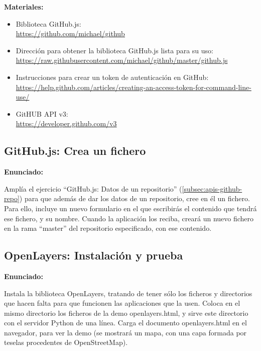 \textbf{Materiales:}

\begin{itemize}
\item Biblioteca GitHub.js: \\
  \url{https://github.com/michael/github}
\item Dirección para obtener la biblioteca GitHub.js lista para su uso: \\
  \url{https://raw.githubusercontent.com/michael/github/master/github.js}
\item Instrucciones para crear un token de autenticación en GitHub: \\
  \url{https://help.github.com/articles/creating-an-access-token-for-command-line-use/}
\item GitHUB API v3: \\
  \url{https://developer.github.com/v3}
\end{itemize}

\subsection{GitHub.js: Crea un fichero}
\label{subsec:apis-github-file}

\textbf{Enunciado:}

Amplía el ejercicio ``GitHub.js: Datos de un repositorio'' (\ref{subsec:apis-github-repo}) para que además de dar los datos de un repositorio, cree en él un fichero. Para ello, incluye un nuevo formulario en el que escribirás el contenido que tendrá ese fichero, y su nombre. Cuando la aplicación los reciba, creará un nuevo fichero en la rama ``master'' del repositorio especificado, con ese contenido.


\subsection{OpenLayers: Instalación y prueba}
\label{subsec:apis-openlayers-instal}

\textbf{Enunciado:}

Instala la biblioteca OpenLayers, tratando de tener sólo los ficheros y directorios que hacen falta para que funcionen las aplicaciones que la usen. Coloca en el mismo directorio los ficheros de la demo openlayers.html, y sirve este directorio con el servidor Python de una línea. Carga el documento openlayers.html en el navegador, para ver la demo (se mostrará un mapa, con una capa formada por teselas procedentes de OpenStreetMap).

